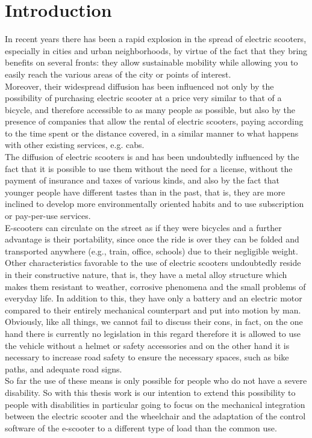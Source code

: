 \documentclass[binding=0.6cm,LaM,noexaminfo]{sapthesis}
\begin{document}
\tableofcontents


\mainmatter
\chapter{Introduction}
In recent years there has been a rapid explosion in the spread of electric scooters, especially in cities and urban neighborhoods, by virtue of the fact that they bring benefits on several fronts: they allow sustainable mobility while allowing you to easily reach the various areas of the city or points of interest.\\
Moreover, their widespread diffusion has been influenced not only by the possibility of purchasing electric scooter at a price very similar to that of a bicycle, and therefore accessible to as many people as possible, but also by the presence of companies that allow the rental of electric scooters, paying according to the time spent or the distance covered, in a similar manner to what happens with other existing services, e.g. cabs. \\
The diffusion of electric scooters is and has been undoubtedly influenced by the fact that it is possible to use them without the need for a license, without the payment of insurance and taxes of various kinds, and also by the fact that younger people have different tastes than in the past, that is, they are more inclined to develop more environmentally oriented habits and to use subscription or pay-per-use services.\\
E-scooters can circulate on the street as if they were bicycles and a further advantage is their portability, since once the ride is over they can be folded and transported anywhere (e.g., train, office, schools) due to their negligible weight. Other characteristics favorable to the use of electric scooters undoubtedly reside in their constructive nature, that is, they have a metal alloy structure which makes them resistant to weather, corrosive phenomena and the small problems of everyday life. In addition to this, they have only a battery and an electric motor compared to their entirely mechanical counterpart and put into motion by man. \\
Obviously, like all things, we cannot fail to discuss their cons, in fact, on the one hand there is currently no legislation in this regard therefore it is allowed to use the vehicle without a helmet or safety accessories and on the other hand it is necessary to increase road safety to ensure the necessary spaces, such as bike paths, and adequate road signs.\\
So far the use of these means is only possible for people who do not have a severe disability. So with this thesis work  is our intention to extend this possibility to people with disabilities in particular going to focus on the mechanical integration between the electric scooter and the wheelchair and the adaptation of the control software of the e-scooter to a different type of load than the common use.
\end{document}
